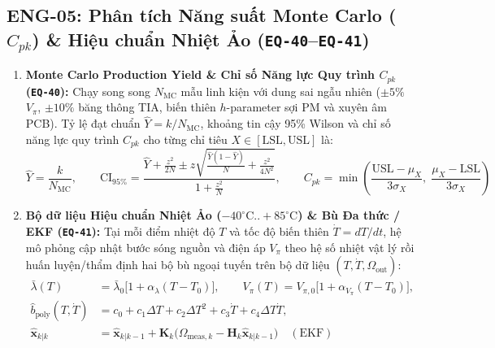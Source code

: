 \documentclass[11pt, a4paper]{article}
\begin{document}
\subsection{ENG-05: Phân tích Năng suất Monte Carlo ($C_{pk}$) \& Hiệu chuẩn Nhiệt Ảo (\texttt{EQ-40}--\texttt{EQ-41})}
\begin{enumerate}
    \item \textbf{Monte Carlo Production Yield \& Chỉ số Năng lực Quy trình $C_{pk}$ (\texttt{EQ-40}):} Chạy song song $N_{\text{MC}}$ mẫu linh kiện với dung sai ngẫu nhiên ($\pm 5\%$ $V_\pi$, $\pm 10\%$ băng thông TIA, biến thiên $h$-parameter sợi PM và xuyên âm PCB). Tỷ lệ đạt chuẩn $\hat{Y} = k/N_{\text{MC}}$, khoảng tin cậy 95\% Wilson và chỉ số năng lực quy trình $C_{pk}$ cho từng chỉ tiêu $X \in [\mathrm{LSL}, \mathrm{USL}]$ là:
    \begin{equation}
    \hat{Y} = \frac{k}{N_{\text{MC}}}, \qquad
    \mathrm{CI}_{95\%} = \frac{\hat{Y} + \frac{z^2}{2N} \pm z\sqrt{\frac{\hat{Y}(1-\hat{Y})}{N} + \frac{z^2}{4N^2}}}{1 + \frac{z^2}{N}}, \qquad
    C_{pk} = \min\!\left(\frac{\mathrm{USL} - \mu_X}{3\sigma_X},\; \frac{\mu_X - \mathrm{LSL}}{3\sigma_X}\right)
    \label{eq:eq40_yield}
    \end{equation}
    \item \textbf{Bộ dữ liệu Hiệu chuẩn Nhiệt Ảo ($-40^\circ\text{C}..+85^\circ\text{C}$) \& Bù Đa thức / EKF (\texttt{EQ-41}):}
    Tại mỗi điểm nhiệt độ $T$ và tốc độ biến thiên $\dot{T} = dT/dt$, hệ mô phỏng cập nhật bước sóng nguồn và điện áp $V_\pi$ theo hệ số nhiệt vật lý rồi huấn luyện/thẩm định hai bộ bù ngoại tuyến trên bộ dữ liệu $(T, \dot{T}, \Omega_{\text{out}})$:
    \begin{equation}
    \begin{aligned}
    \bar{\lambda}(T) &= \bar{\lambda}_0\bigl[1 + \alpha_\lambda(T - T_0)\bigr], \qquad
    V_\pi(T) = V_{\pi,0}\bigl[1 + \alpha_{V_\pi}(T - T_0)\bigr], \\
    \hat{b}_{\text{poly}}(T, \dot{T}) &= c_0 + c_1\Delta T + c_2\Delta T^2 + c_3\dot{T} + c_4\Delta T\dot{T}, \\
    \hat{\mathbf{x}}_{k|k} &= \hat{\mathbf{x}}_{k|k-1} + \mathbf{K}_k\bigl(\Omega_{\text{meas},k} - \mathbf{H}_k\hat{\mathbf{x}}_{k|k-1}\bigr) \quad (\text{EKF})
    \end{aligned}
    \label{eq:eq41_thermal_cal}
    \end{equation}
\end{enumerate}

\end{document}
